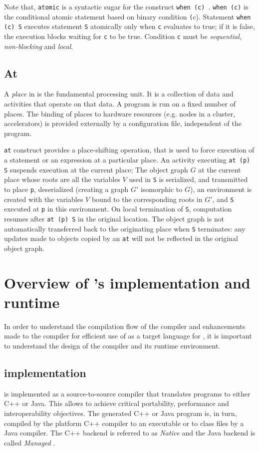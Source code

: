 Note that, \texttt{atomic} is a syntactic sugar for the construct \texttt{when
(c) }. \texttt{when (c)} is the conditional atomic statement based on binary 
condition \texttt(c). Statement \texttt{when (c) S} executes statement
\texttt{S} atomically only when \texttt{c} evaluates to true; if it is false,
the execution blocks waiting for \texttt{c} to be true. Condition \texttt{c}
must be \emph{sequential}, \emph{non-blocking} and \emph{local}.

\subsection{At} A \emph{place} in \xten is the fundamental processing unit. It
is a collection of data and activities that operate on that data. A program is
run on a fixed number of places. The binding of places to hardware resources
(e.g. nodes in a cluster, accelerators) is provided externally by a
configuration file, independent of the program. 

\texttt{at} construct provides a place-shifting operation, that is used to force
execution of a statement or an expression at a particular place. An activity
executing \texttt{at (p) S} suspends execution at the current place; The object
graph $G$ at the current place whose roots are all the variables $V$ used in
\texttt{S}
is serialized, and transmitted to place \texttt{p}, deserialized 
(creating a graph $G'$
isomorphic to $G$), an environment is created with the variables $V$ bound to
the corresponding roots in $G'$, and \texttt{S} executed at \texttt{p} in this 
environment. On
local termination of \texttt{S}, computation 
resumes after \texttt{at (p) S} in the original
location. The object graph is not automatically transferred back to the
originating place when \texttt{S} terminates: any updates made to 
objects copied by an \texttt{at}
will not be reflected in the original object graph. 

\section{Overview of \xten's implementation and runtime}

In order to understand the compilation flow of the \mixten compiler and
enhancements made to the \xten compiler for efficient use of \xten as a target
language for \matlab, it is important to understand the design of the \xten
compiler and its runtime environment.  

\subsection{\xten implementation}
\xten is implemented as a source-to-source compiler that translates \xten
programs to either C++ or Java. This allows \xten to achieve critical
portability, performance and interoperability objectives. The generated C++ or
Java program is, in turn, compiled by the platform C++ compiler to an executable
or to class files by a Java compiler. The C++ backend is referred to as
\emph{Native \xten} and the Java backend is called \emph{Managed \xten}. 

